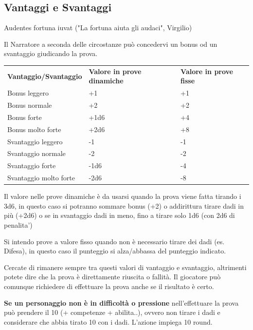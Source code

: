 \documentclass[a4paper,11pt,twoside,openany]{book}
\begin{document}
\bigskip

\subsection{Vantaggi e Svantaggi}

\begin{tcolorbox}[enhanced,arc=5pt,boxrule=0.3pt]{ Audentes fortuna iuvat ("La fortuna aiuta gli audaci", Virgilio) }\end{tcolorbox}

Il Narratore a seconda delle circostanze può concedervi un bonus od un svantaggio giudicando la prova.

\bigskip

\begin{tabular}{lll}
	\toprule
	\textbf{Vantaggio/Svantaggio} & \textbf{Valore in prove dinamiche} & \textbf{Valore in prove fisse}\\
	Bonus leggero & +1 & +1\\
	Bonus normale & +2 & +2\\
	Bonus forte   & +1d6               & +4\\
	Bonus molto forte             & +2d6               & +8\\
	Svantaggio leggero            & -1 & -1\\
	Svantaggio normale            & -2 & -2\\
	Svantaggio forte              & -1d6               & -4\\
	Svantaggio molto forte        & -2d6               & -8\\
\end{tabular}

\bigskip

Il valore nelle prove dinamiche è da usarsi quando la prova viene fatta tirando i 3d6, in questo caso si potranno sommare bonus (+2) o addirittura tirare dadi in più (+2d6) o se in svantaggio dadi in meno, fino a tirare solo 1d6 (con 2d6 di penalita')

Si intendo prove a valore fisso quando non è necessario tirare dei dadi (es. Difesa), in questo caso il punteggio si alza/abbassa del punteggio indicato.

Cercate di rimanere sempre tra questi valori di vantaggio e svantaggio, altrimenti potete dire che la prova è direttamente riuscita o fallità.
Il giocatore può comunque richiedere di effettuare la prova anche se il risultato è certo.

\textbf{Se un personaggio non è in difficoltà o pressione} nell'effettuare la prova può prendere il 10 (+ competenze + abilita..), ovvero non tirare i dadi e considerare che abbia tirato 10 con i dadi. L'azione impiega 10 round.
\end{document}
